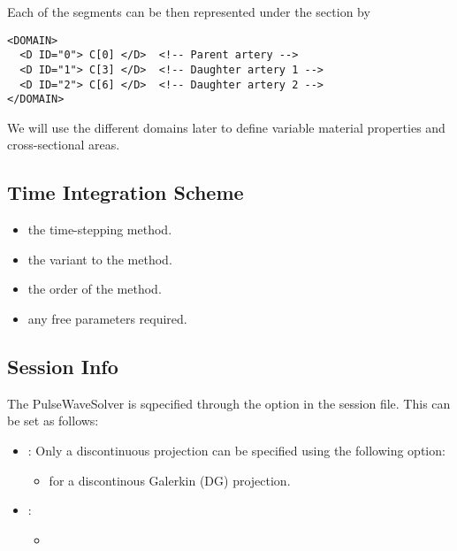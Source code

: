 Each of the segments can be then represented under the section  by
\begin{lstlisting}[style=XmlStyle]
<DOMAIN> 
  <D ID="0"> C[0] </D>	<!-- Parent artery -->
  <D ID="1"> C[3] </D>	<!-- Daughter artery 1 -->
  <D ID="2"> C[6] </D>	<!-- Daughter artery 2 -->
</DOMAIN>
\end{lstlisting}

We will use the different domains later to define variable material properties and cross-sectional areas.

\subsection{Time Integration Scheme}

\begin{itemize}
\item {} the time-stepping method.
\item {} the variant to the method. 
\item {} the order of the method.
\item {} any free parameters required.
\end{itemize}

\subsection{Session Info}
The PulseWaveSolver is sqpecified through the 
option in the session file. This can be set as follows:
\begin{itemize}
\item {}: Only a discontinuous projection can be specified
using the following option:
    \begin{itemize}
    \item {} for a discontinous Galerkin (DG) projection.
    \end{itemize}
\item {}:
    \begin{itemize}
    \item {}
    \end{itemize}
\end{itemize}

